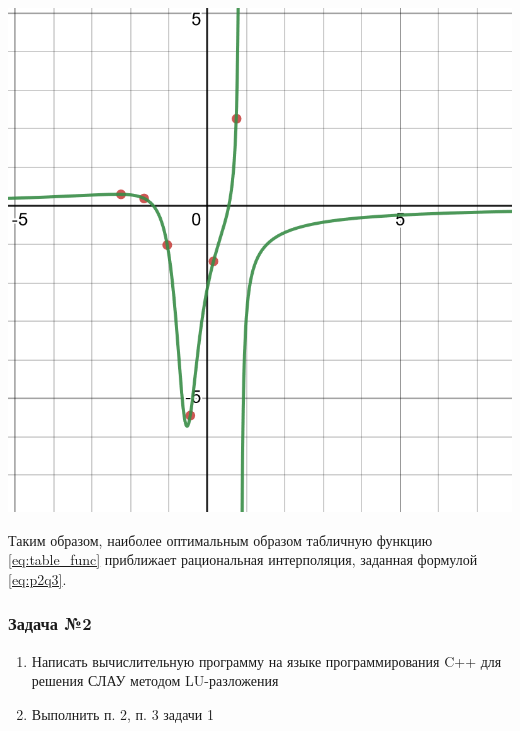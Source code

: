\documentclass[a4paper, fontsize=14pt]{article}
\begin{document}
\begin{center}
    \label{p2q3}
        \includegraphics[scale=0.3]{src/p2q3}
\end{center}    

Таким образом, наиболее оптимальным образом табличную функцию \eqref{eq:table_func} приближает рациональная интерполяция, заданная формулой \eqref{eq:p2q3}.

\subsubsection*{Задача №2}
\begin{enumerate}
    \item Написать вычислительную программу на языке программирования C++
    для решения СЛАУ методом LU-разложения
    \item Выполнить п. 2, п. 3 задачи 1
\end{enumerate}
\end{document}
